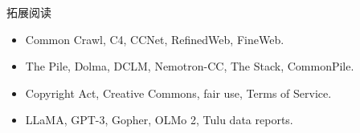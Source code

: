 \documentclass[a4paper]{article}
\begin{document}
\begin{knowledgebox}{拓展阅读}
\begin{itemize}
    \item Common Crawl, C4, CCNet, RefinedWeb, FineWeb.
    \item The Pile, Dolma, DCLM, Nemotron-CC, The Stack, CommonPile.
    \item Copyright Act, Creative Commons, fair use, Terms of Service.
    \item LLaMA, GPT-3, Gopher, OLMo 2, Tulu data reports.
\end{itemize}
\end{knowledgebox}
\end{document}
